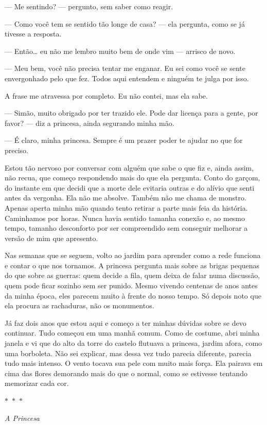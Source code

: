 — Me sentindo? — pergunto, sem saber como reagir.

— Como você tem se sentido tão longe de casa? — ela pergunta, como se já tivesse a resposta.

— Então… eu não me lembro muito bem de onde vim — arrisco de novo.

— Meu bem, você não precisa tentar me enganar. Eu sei como você se sente envergonhado pelo que fez. Todos aqui entendem e ninguém te julga por isso.

A frase me atravessa por completo. Eu não contei, mas ela sabe.

— Simão, muito obrigado por ter trazido ele. Pode dar licença para a gente, por favor? — diz a princesa, ainda segurando minha mão.

— É claro, minha princesa. Sempre é um prazer poder te ajudar no que for preciso.

Estou tão nervoso por conversar com alguém que sabe o que fiz e, ainda assim, não recua, que começo respondendo mais do que ela pergunta. Conto do garçom, do instante em que decidi que a morte dele evitaria outras e do alívio que senti antes da vergonha. Ela não me absolve. Também não me chama de monstro. Apenas aperta minha mão quando tento retirar a parte mais feia da história. Caminhamos por horas. Nunca havia sentido tamanha conexão e, ao mesmo tempo, tamanho desconforto por ser compreendido sem conseguir melhorar a versão de mim que apresento.

Nas semanas que se seguem, volto ao jardim para aprender como a rede funciona e contar o que nos tornamos. A princesa pergunta mais sobre as brigas pequenas do que sobre as guerras: quem decide a fila, quem deixa de falar numa discussão, quem pode ficar sozinho sem ser punido. Mesmo vivendo centenas de anos antes da minha época, eles parecem muito à frente do nosso tempo. Só depois noto que ela procura as rachaduras, não os monumentos.

\bigskip

Já faz dois anos que estou aqui e começo a ter minhas dúvidas sobre se devo continuar. Tudo começou em uma manhã comum. Como de costume, abri minha janela e vi que do alto da torre do castelo flutuava a princesa, jardim afora, como uma borboleta. Não sei explicar, mas dessa vez tudo parecia diferente, parecia tudo mais intenso. O vento tocava sua pele com muito mais força. Ela pairava em cima das flores demorando mais do que o normal, como se estivesse tentando memorizar cada cor.

\begin{center}
$\ast$~$\ast$~$\ast$

\textit{A Princesa}
\end{center}

